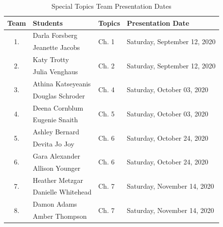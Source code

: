 \documentclass[
]{article}
\begin{document}
\begin{table}[H]
\begin{center}
\caption{Special Topics Team Presentation Dates}
\vspace{3mm}
\begin{tabular}{clll}
\hline
\textbf{Team} & \textbf{Students} & \textbf{Topics} & \textbf{Presentation Date} \\
\hline

\multirow{2}{*}{1.} & Darla Forsberg & \multirow{2}{*}{Ch. 1} & \multirow{2}{*}{Saturday, September 12, 2020} \\
& Jeanette Jacobs &  &  \\
\hline

\multirow{2}{*}{2.} & Katy Trotty & \multirow{2}{*}{Ch. 2} & \multirow{2}{*}{Saturday, September 12, 2020} \\
& Julia Venghaus &  &  \\
\hline

\multirow{2}{*}{3.} & Athina Katseyeanis & \multirow{2}{*}{Ch. 4} & \multirow{2}{*}{Saturday, October 03, 2020} \\
& Douglas Schroder &  &  \\
\hline

\multirow{2}{*}{4.} & Deena Cornblum & \multirow{2}{*}{Ch. 5} & \multirow{2}{*}{Saturday, October 03, 2020} \\
& Eugenie Snaith &  &  \\
\hline

\multirow{2}{*}{5.} & Ashley Bernard & \multirow{2}{*}{Ch. 6} & \multirow{2}{*}{Saturday, October 24, 2020} \\
& Devita Jo Joy &  &  \\
\hline

\multirow{2}{*}{6.} & Gara Alexander & \multirow{2}{*}{Ch. 6} & \multirow{2}{*}{Saturday, October 24, 2020} \\
& Allison Younger &  &  \\
\hline

\multirow{2}{*}{7.} & Heather Metzgar & \multirow{2}{*}{Ch. 7} & \multirow{2}{*}{Saturday, November 14, 2020} \\
& Danielle Whitehead &  &  \\
\hline

\multirow{2}{*}{8.} & Damon Adams & \multirow{2}{*}{Ch. 7} & \multirow{2}{*}{Saturday, November 14, 2020} \\
& Amber Thompson &  &  \\
\hline

\end{tabular}
\end{center}
\end{table}
\end{document}
